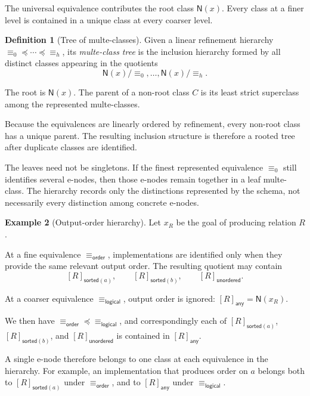 \documentclass[sigconf,nonacm]{acmart}
\theoremstyle{definition}
\newtheorem{definition}{Definition}[section]
\newtheorem{example}[definition]{Example}
\theoremstyle{plain}
\theoremstyle{remark}
\begin{document}
The universal equivalence contributes the root class
\(\mathsf{N}(x)\).
Every class at a finer level is contained in a unique class at every
coarser level.

\begin{definition}[Tree of multe-classes]
Given a linear refinement hierarchy
\(\equiv_0\preceq\cdots\preceq\equiv_h\),
its \emph{multe-class tree} is the inclusion hierarchy formed by all
distinct classes appearing in the quotients
\[
\mathsf{N}(x)/{\equiv_0},
\ldots,
\mathsf{N}(x)/{\equiv_h}.
\]

The root is \(\mathsf{N}(x)\).
The parent of a non-root class \(C\) is its least strict superclass
among the represented multe-classes.
\end{definition}

Because the equivalences are linearly ordered by refinement, every
non-root class has a unique parent.  The resulting inclusion structure
is therefore a rooted tree after duplicate classes are identified.

The leaves need not be singletons.  If the finest represented
equivalence \(\equiv_0\) still identifies several e-nodes, then those
e-nodes remain together in a leaf multe-class.  The hierarchy records
only the distinctions represented by the schema, not necessarily every
distinction among concrete e-nodes.

\begin{example}[Output-order hierarchy]
Let \(x_R\) be the goal of producing relation \(R\).

At a fine equivalence \(\equiv_{\mathsf{order}}\), implementations are
identified only when they provide the same relevant output order.  The
resulting quotient may contain
\[
[R]_{\mathsf{sorted}(a)},
\qquad
[R]_{\mathsf{sorted}(b)},
\qquad
[R]_{\mathsf{unordered}}.
\]

At a coarser equivalence \(\equiv_{\mathsf{logical}}\), output order
is ignored: \([R]_{\mathsf{any}} = \mathsf{N}(x_R)\).

We then have
\(\equiv_{\mathsf{order}} \preceq \equiv_{\mathsf{logical}}\),
and correspondingly each of
\([R]_{\mathsf{sorted}(a)}\), \([R]_{\mathsf{sorted}(b)}\), and
\([R]_{\mathsf{unordered}}\) is contained in
\([R]_{\mathsf{any}}\).
\end{example}

A single e-node therefore belongs to one class at each equivalence in
the hierarchy.  For example, an implementation that produces order on
\(a\) belongs both to \([R]_{\mathsf{sorted}(a)}\) under
\(\equiv_{\mathsf{order}}\), and to \([R]_{\mathsf{any}}\) under
\(\equiv_{\mathsf{logical}}\).
\end{document}
